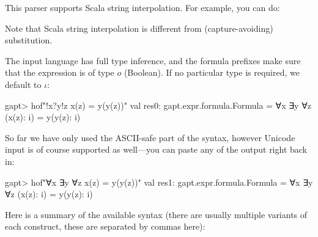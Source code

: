 \documentclass[a4paper,11pt]{book}
\begin{document}
This parser supports Scala string interpolation. For example, you can do:

Note that Scala string interpolation is different from (capture-avoiding) substitution.

The input language has full type inference, and the formula
prefixes make sure that the expression is of type $o$ (Boolean).  If no
particular type is required, we default to $\iota$:
\begin{clilisting}
  gapt> hof"!x?y!z x(z) = y(y(z))"
  val res0: gapt.expr.formula.Formula = ∀x ∃y ∀z (x(z): i) = y(y(z): i)

\end{clilisting}

So far we have only used the ASCII-safe part of the syntax, however Unicode
input is of course supported as well---you can paste any of the output right
back in:
\begin{clilisting}
  gapt> hof"∀x ∃y ∀z x(z) = y(y(z))"
  val res1: gapt.expr.formula.Formula = ∀x ∃y ∀z (x(z): i) = y(y(z): i)

\end{clilisting}

Here is a summary of the available syntax (there are usually multiple variants
of each construct, these are separated by commas here):
\end{document}
